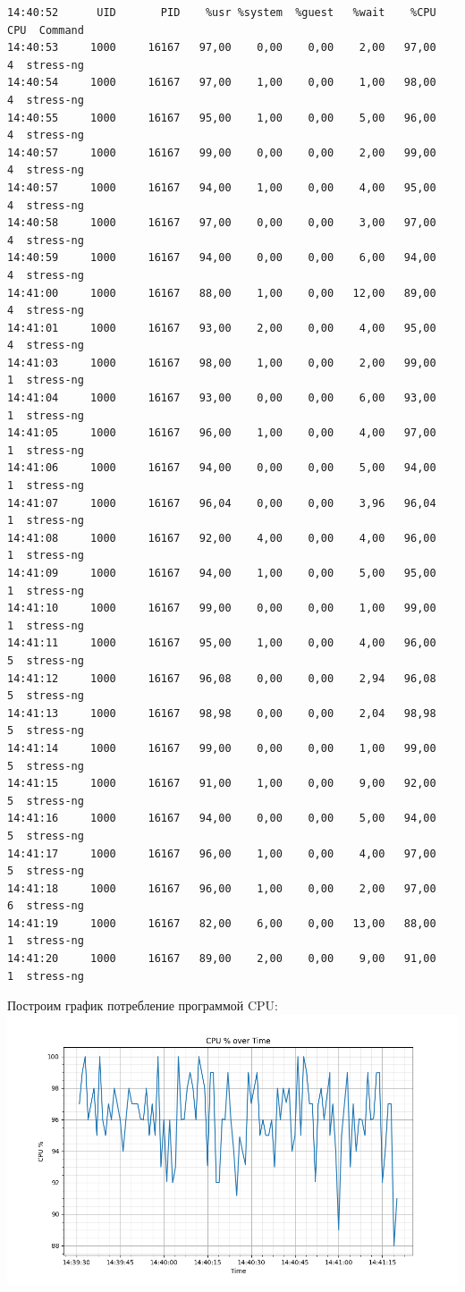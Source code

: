 \documentclass[12pt,onecolumn]{article}
\begin{document}
\begin{verbatim}
14:40:52      UID       PID    %usr %system  %guest   %wait    %CPU   CPU  Command
14:40:53     1000     16167   97,00    0,00    0,00    2,00   97,00     4  stress-ng
14:40:54     1000     16167   97,00    1,00    0,00    1,00   98,00     4  stress-ng
14:40:55     1000     16167   95,00    1,00    0,00    5,00   96,00     4  stress-ng
14:40:57     1000     16167   99,00    0,00    0,00    2,00   99,00     4  stress-ng
14:40:57     1000     16167   94,00    1,00    0,00    4,00   95,00     4  stress-ng
14:40:58     1000     16167   97,00    0,00    0,00    3,00   97,00     4  stress-ng
14:40:59     1000     16167   94,00    0,00    0,00    6,00   94,00     4  stress-ng
14:41:00     1000     16167   88,00    1,00    0,00   12,00   89,00     4  stress-ng
14:41:01     1000     16167   93,00    2,00    0,00    4,00   95,00     4  stress-ng
14:41:03     1000     16167   98,00    1,00    0,00    2,00   99,00     1  stress-ng
14:41:04     1000     16167   93,00    0,00    0,00    6,00   93,00     1  stress-ng
14:41:05     1000     16167   96,00    1,00    0,00    4,00   97,00     1  stress-ng
14:41:06     1000     16167   94,00    0,00    0,00    5,00   94,00     1  stress-ng
14:41:07     1000     16167   96,04    0,00    0,00    3,96   96,04     1  stress-ng
14:41:08     1000     16167   92,00    4,00    0,00    4,00   96,00     1  stress-ng
14:41:09     1000     16167   94,00    1,00    0,00    5,00   95,00     1  stress-ng
14:41:10     1000     16167   99,00    0,00    0,00    1,00   99,00     1  stress-ng
14:41:11     1000     16167   95,00    1,00    0,00    4,00   96,00     5  stress-ng
14:41:12     1000     16167   96,08    0,00    0,00    2,94   96,08     5  stress-ng
14:41:13     1000     16167   98,98    0,00    0,00    2,04   98,98     5  stress-ng
14:41:14     1000     16167   99,00    0,00    0,00    1,00   99,00     5  stress-ng
14:41:15     1000     16167   91,00    1,00    0,00    9,00   92,00     5  stress-ng
14:41:16     1000     16167   94,00    0,00    0,00    5,00   94,00     5  stress-ng
14:41:17     1000     16167   96,00    1,00    0,00    4,00   97,00     5  stress-ng
14:41:18     1000     16167   96,00    1,00    0,00    2,00   97,00     6  stress-ng
14:41:19     1000     16167   82,00    6,00    0,00   13,00   88,00     1  stress-ng
14:41:20     1000     16167   89,00    2,00    0,00    9,00   91,00     1  stress-ng
\end{verbatim}
Построим график потребление программой CPU:\\
\includegraphics[width=\textwidth]{image/cpu_usage.png}
\end{document}
